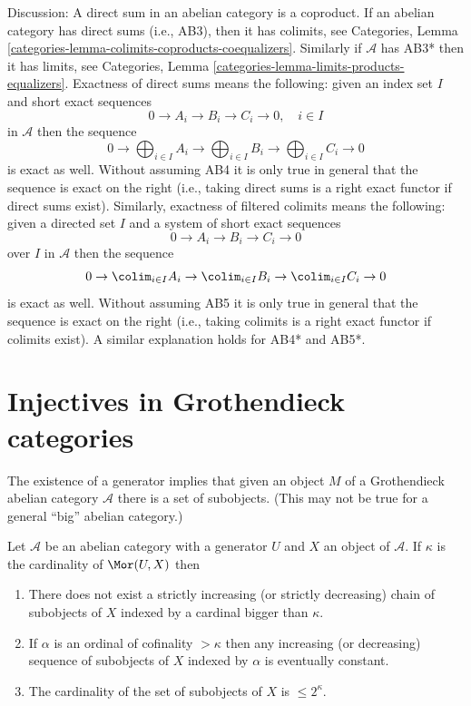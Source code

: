 \noindent
Discussion: A direct sum in an abelian category is a coproduct.
If an abelian category has direct sums (i.e., AB3), then it has colimits, see
Categories, Lemma \ref{categories-lemma-colimits-coproducts-coequalizers}. 
Similarly if $\mathcal{A}$ has AB3* then it has limits, see
Categories, Lemma \ref{categories-lemma-limits-products-equalizers}. 
Exactness of direct sums means the following: given an index set $I$
and short exact sequences
$$
0 \to A_i \to B_i \to C_i \to 0,\quad i \in I
$$
in $\mathcal{A}$ then the sequence
$$
0 \to
\bigoplus\nolimits_{i \in I} A_i \to
\bigoplus\nolimits_{i \in I} B_i \to
\bigoplus\nolimits_{i \in I} C_i \to 0
$$
is exact as well. Without assuming AB4 it is only true in general that
the sequence is exact on the right (i.e., taking direct sums is a right
exact functor if direct sums exist). Similarly, exactness of filtered
colimits means the following: given a directed set $I$
and a system of short exact sequences
$$
0 \to A_i \to B_i \to C_i \to 0
$$
over $I$ in $\mathcal{A}$ then the sequence
$$
0 \to
\colim_{i \in I} A_i \to
\colim_{i \in I} B_i \to
\colim_{i \in I} C_i \to 0
$$
is exact as well. Without assuming AB5 it is only true in general that
the sequence is exact on the right (i.e., taking colimits is a right
exact functor if colimits exist). A similar explanation holds for
AB4* and AB5*.



\section{Injectives in Grothendieck categories}
\label{section-grothendieck-categories}

\noindent
The existence of a generator implies that given an object $M$ of a
Grothendieck abelian category $\mathcal{A}$ there is a set of subobjects.
(This may not be true for a general ``big'' abelian category.)

\begin{lemma}
\label{lemma-set-of-subobjects}
Let $\mathcal{A}$ be an abelian category with a generator $U$ and
$X$ an object of $\mathcal{A}$. If $\kappa$ is the cardinality of
$\Mor(U, X)$ then
\begin{enumerate}
\item There does not exist a strictly increasing
(or strictly decreasing) chain of subobjects
of $X$ indexed by a cardinal bigger than $\kappa$.
\item If $\alpha$ is an ordinal of cofinality $> \kappa$
then any increasing (or decreasing) sequence of subobjects
of $X$ indexed by $\alpha$ is eventually constant.
\item The cardinality of the set of subobjects of $X$
is $\leq 2^\kappa$.
\end{enumerate}
\end{lemma}

